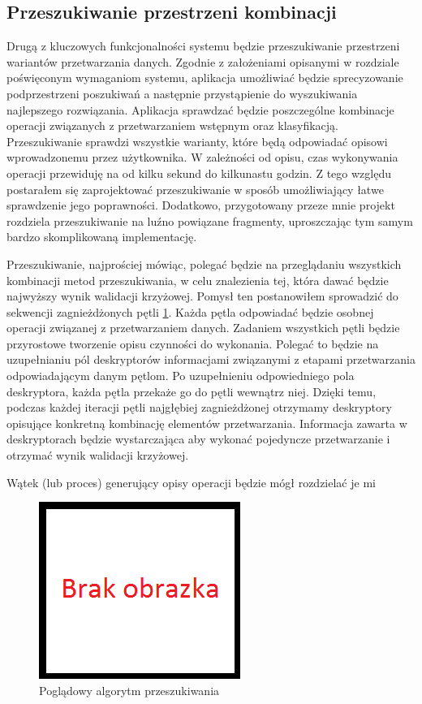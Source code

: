 \documentclass[../thesis.tex]{subfiles}
\begin{document}
\subsection{Przeszukiwanie przestrzeni kombinacji}

Drugą z kluczowych funkcjonalności systemu będzie przeszukiwanie przestrzeni wariantów przetwarzania danych. Zgodnie z założeniami opisanymi w rozdziale poświęconym wymaganiom systemu, aplikacja umożliwiać będzie sprecyzowanie podprzestrzeni poszukiwań a następnie przystąpienie do wyszukiwania najlepszego rozwiązania. Aplikacja sprawdzać będzie poszczególne kombinacje operacji związanych z przetwarzaniem wstępnym oraz klasyfikacją. Przeszukiwanie sprawdzi wszystkie warianty, które będą odpowiadać opisowi wprowadzonemu przez użytkownika. W zależności od opisu, czas wykonywania operacji przewiduję na od kilku sekund do kilkunastu godzin. Z tego względu postarałem się zaprojektować przeszukiwanie w sposób umożliwiający łatwe sprawdzenie jego poprawności. Dodatkowo, przygotowany przeze mnie projekt rozdziela przeszukiwanie na luźno powiązane fragmenty, uproszczając tym samym bardzo skomplikowaną implementację.

Przeszukiwanie, najprościej mówiąc, polegać będzie na przeglądaniu wszystkich kombinacji metod przeszukiwania, w celu znalezienia tej, która dawać będzie najwyższy wynik walidacji krzyżowej. Pomysł ten postanowiłem sprowadzić do sekwencji zagnieżdżonych pętli \ref{proj:algo_search}. Każda pętla odpowiadać będzie osobnej operacji związanej z przetwarzaniem danych. Zadaniem wszystkich pętli będzie przyrostowe tworzenie opisu czynności do wykonania. Polegać to będzie na uzupełnianiu pól deskryptorów informacjami związanymi z etapami przetwarzania odpowiadającym danym pętlom. Po uzupełnieniu odpowiedniego pola deskryptora, każda pętla przekaże go do pętli wewnątrz niej. Dzięki temu, podczas każdej iteracji pętli najgłębiej zagnieżdżonej otrzymamy deskryptory opisujące konkretną kombinację elementów przetwarzania. Informacja zawarta w deskryptorach będzie wystarczająca aby wykonać pojedyncze przetwarzanie i otrzymać wynik walidacji krzyżowej. 

Wątek (lub proces) generujący opisy operacji będzie mógł rozdzielać je mi

\begin{figure}
\centering
\includegraphics{missing.png}
\caption{Poglądowy algorytm przeszukiwania}
\label{proj:algo_search}
\end{figure}
\end{document}
